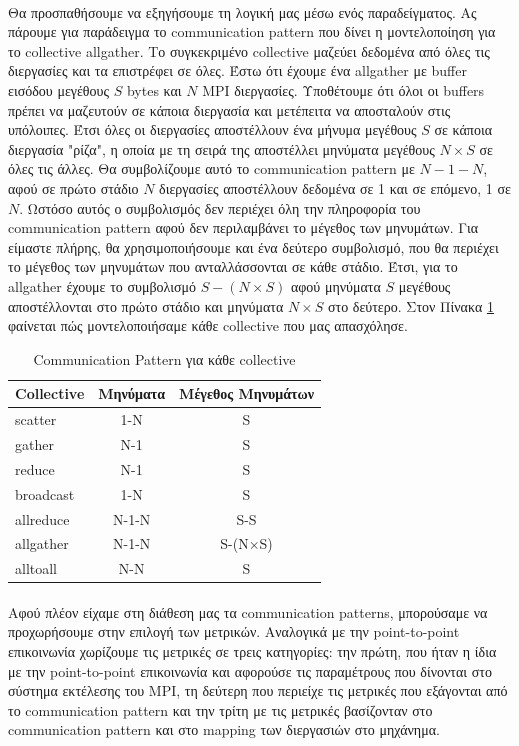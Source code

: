 \paragraph{}
Θα προσπαθήσουμε να εξηγήσουμε τη λογική μας μέσω ενός παραδείγματος. Ας πάρουμε για παράδειγμα το communication pattern που δίνει η μοντελοποίηση για το collective allgather. Tο συγκεκριμένο collective μαζεύει δεδομένα από όλες τις διεργασίες και τα επιστρέφει σε όλες. Έστω ότι έχουμε ένα allgather με buffer εισόδου μεγέθους $S$ bytes και $N$ MPI διεργασίες. Υποθέτουμε ότι όλοι οι buffers πρέπει να μαζευτούν σε κάποια διεργασία και μετέπειτα να αποσταλούν στις υπόλοιπες. Έτσι όλες οι διεργασίες αποστέλλουν ένα μήνυμα μεγέθους $S$ σε κάποια διεργασία "ρίζα",  η οποία με τη σειρά της αποστέλλει μηνύματα μεγέθους $N\times S$ σε όλες τις άλλες. Θα συμβολίζουμε αυτό το communication pattern με $N - 1 - N$, αφού σε πρώτο στάδιο $N$ διεργασίες αποστέλλουν δεδομένα σε 1 και σε επόμενο, 1 σε $N$. Ωστόσο αυτός ο συμβολισμός δεν περιέχει όλη την πληροφορία του communication pattern αφού δεν περιλαμβάνει το μέγεθος των μηνυμάτων. Για είμαστε πλήρης, θα χρησιμοποιήσουμε και ένα δεύτερο συμβολισμό, που θα περιέχει το μέγεθος των μηνυμάτων που ανταλλάσσονται σε κάθε στάδιο. Έτσι, για το allgather έχουμε το συμβολισμό $S-(N\times S)$ αφού μηνύματα $S$ μεγέθους αποστέλλονται στο πρώτο στάδιο και μηνύματα $N\times S$ στο δεύτερο. Στον Πίνακα \ref{table:coll} φαίνεται πώς μοντελοποιήσαμε κάθε collective που μας απασχόλησε.
\begin{table}[t]
\centering
\caption{Communication Pattern για κάθε collective}
\label{table:coll}
\begin{tabular}{l|c|c}
\textbf{Collective} & \textbf{Μηνύματα} & \textbf{Μέγεθος Μηνυμάτων} \\ \hline
scatter    & 1-N      & S                 \\
gather     & N-1      & S                 \\
reduce     & N-1      & S                 \\
broadcast  & 1-N      & S                 \\
allreduce  & N-1-N    & S-S               \\
allgather  & N-1-N    & S-(N$\times$S)           \\
alltoall   & N-N      & S                
\end{tabular}
\end{table}

\paragraph{}
Αφού πλέον είχαμε στη διάθεση μας τα communication patterns, 	μπορούσαμε να προχωρήσουμε στην επιλογή των μετρικών. Αναλογικά με την point-to-point επικοινωνία χωρίζουμε τις μετρικές σε τρεις κατηγορίες: την πρώτη, που ήταν η ίδια με την point-to-point επικοινωνία και αφορούσε τις παραμέτρους που δίνονται στο σύστημα εκτέλεσης του MPI, τη δεύτερη που περιείχε τις μετρικές που εξάγονται από το communication pattern και την τρίτη με τις μετρικές βασίζονταν στο communication pattern και στο mapping των διεργασιών στο μηχάνημα. 

